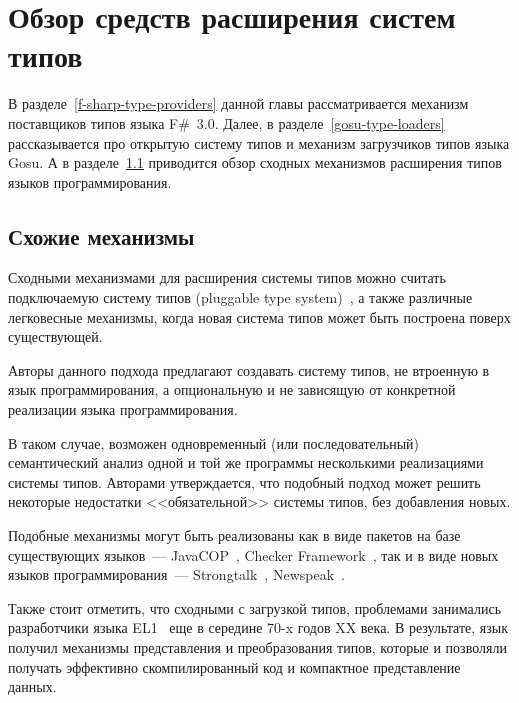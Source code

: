 \section{Обзор средств расширения систем типов}
В разделе~\ref{f-sharp-type-providers} данной главы рассматривается механизм поставщиков типов языка F\#~3.0. Далее, в разделе~\ref{gosu-type-loaders} рассказывается про открытую систему типов и механизм загрузчиков типов языка Gosu. А в разделе~\ref{similar-mechanisms} приводится обзор сходных механизмов расширения типов языков программирования.




\subsection{Схожие механизмы}\label{similar-mechanisms}
Сходными механизмами для расширения системы типов можно считать подключаемую систему типов (pluggable type system)~\cite{bracha}, а также различные легковесные механизмы, когда новая система типов может быть построена поверх существующей.

Авторы данного подхода предлагают создавать систему типов, не втроенную в язык программирования, а опциональную и не зависящую от конкретной реализации языка программирования.

В таком случае, возможен одновременный (или последовательный) семантический анализ одной и той же программы несколькими реализациями системы типов. Авторами утверждается, что подобный подход может решить некоторые недостатки <<обязательной>> системы типов, без добавления новых.

Подобные механизмы могут быть реализованы как в виде пакетов на базе существующих языков~--- JavaCOP~\cite{javacop2010}, Checker Framework~\cite{checkerframework2008},
так и в виде новых языков программирования~--- Strongtalk~\cite{strongtalk1993}, Newspeak~\cite{newspeak2008}.

Также стоит отметить, что сходными с загрузкой типов, проблемами занимались разработчики языка EL1~\cite{el1} еще в середине 70-x годов XX века.
В результате, язык получил механизмы представления и преобразования типов, которые и позволяли получать эффективно скомпилированный код и компактное представление данных.